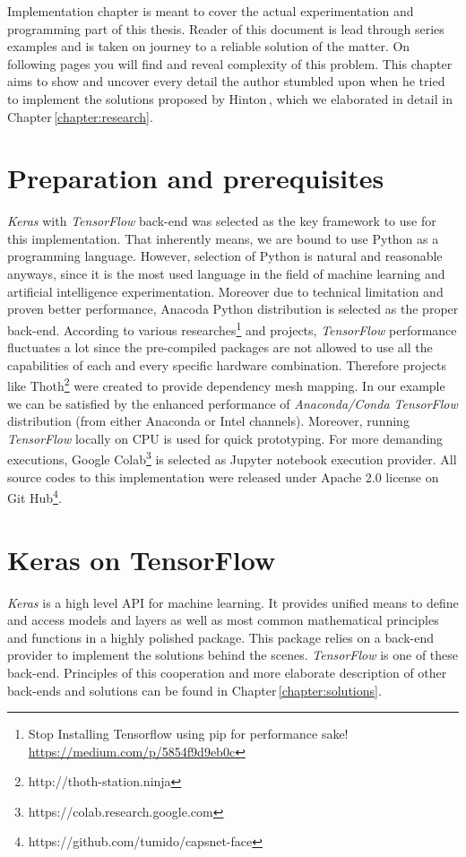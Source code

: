 Implementation chapter is meant to cover the actual experimentation and programming part of this thesis. Reader of this document is lead through series examples and is taken on journey to a reliable solution of the matter. On following pages you will find and reveal complexity of this problem. This chapter aims to show and uncover every detail the author stumbled upon when he tried to implement the solutions proposed by Hinton\,\cite{capsule}, which we elaborated in detail in Chapter\,\ref{chapter:research}.

\section{Preparation and prerequisites}

\textit{Keras} with \textit{TensorFlow} back-end was selected as the key framework to use for this implementation. That inherently means, we are bound to use Python as a programming language. However, selection of Python is natural and reasonable anyways, since it is the most used language in the field of machine learning and artificial intelligence experimentation. Moreover due to technical limitation and proven better performance, Anacoda Python distribution is selected as the proper back-end. According to various researches\footnote{Stop Installing Tensorflow using pip for performance sake! \url{https://medium.com/p/5854f9d9eb0c}} and projects, \textit{TensorFlow} performance fluctuates a lot since the pre-compiled packages are not allowed to use all the capabilities of each and every specific hardware combination. Therefore projects like Thoth\footnote{http://thoth-station.ninja} were created to provide dependency mesh mapping. In our example we can be satisfied by the enhanced performance of \textit{Anaconda/Conda TensorFlow} distribution (from either Anaconda or Intel channels). Moreover, running \textit{TensorFlow} locally on CPU is used for quick prototyping. For more demanding executions, Google Colab\footnote{https://colab.research.google.com} is selected as Jupyter notebook execution provider. All source codes to this implementation were released under Apache 2.0 license on Git Hub\footnote{https://github.com/tumido/capsnet-face}.

\section{Keras on TensorFlow}

\textit{Keras} is a high level API for machine learning. It provides unified means to define and access models and layers as well as most common mathematical principles and functions in a highly polished package. This package relies on a back-end provider to implement the solutions behind the scenes. \textit{TensorFlow} is one of these back-end. Principles of this cooperation and more elaborate description of other back-ends and solutions can be found in Chapter\,\ref{chapter:solutions}.

